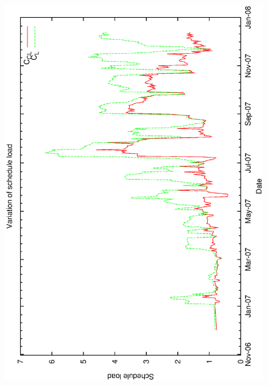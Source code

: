 \begin{figure}[h]
\begin{center}
{   \includegraphics[scale=0.25, angle=-90]{figures/cl_load.eps}
   \label{fig:db_cl_load}
 }
\end{center}
\end{figure}
